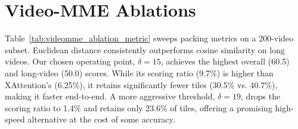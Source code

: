 \documentclass[conference]{IEEEtran}
\begin{document}
\section{Video-MME Ablations}
\label{app:videomme_ablations}

Table~\ref{tab:videomme_ablation_metric} sweeps packing metrics on a 200-video subset. Euclidean distance consistently outperforms cosine similarity on long videos. Our chosen operating point, $\delta{=}15$, achieves the highest overall (60.5) and long-video (50.0) scores. While its scoring ratio (9.7\%) is higher than XAttention's (6.25\%), it retains significantly fewer tiles (30.5\% vs. 40.7\%), making it faster end-to-end. A more aggressive threshold, $\delta{=}19$, drops the scoring ratio to 1.4\% and retains only 23.6\% of tiles, offering a promising high-speed alternative at the cost of some accuracy.

\begin{table}[!ht]
\centering
\caption{Packing metric ablation on Video-MME (200-video subset), Qwen2-VL-7B-Instruct, recall $r{=}0.90$, count-weighting off throughout.}
\label{tab:videomme_ablation_metric}
\end{table}
\end{document}
